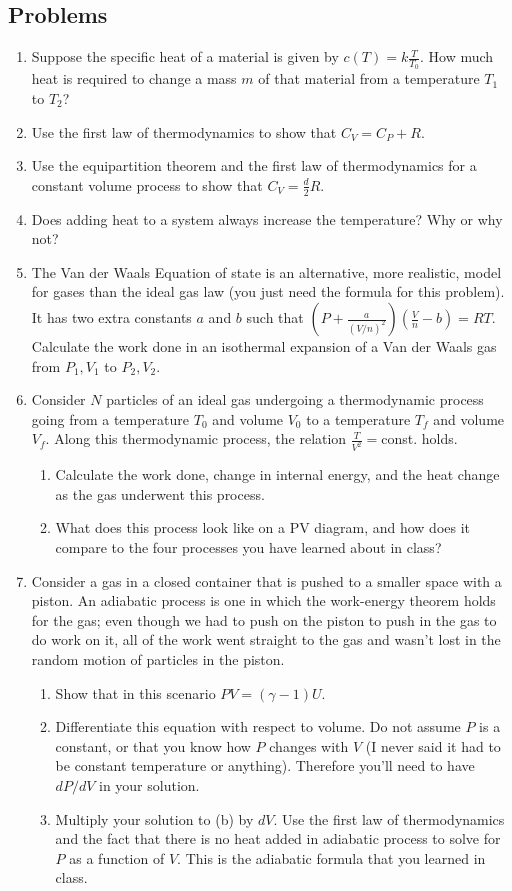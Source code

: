 \documentclass[12pt]{book}
\begin{document}
\subsection{Problems}
\begin{enumerate}
 \item Suppose the specific heat of a material is given by $c(T) = k \frac{T}{T_0}.$ How much heat is required to change a mass $m$ of that material from a temperature $T_1$ to $T_2$?
 \item Use the first law of thermodynamics to show that $C_V = C_P+R.$
 \item Use the equipartition theorem and the first law of thermodynamics for a constant volume process to show that $C_V = \frac{d}{2} R.$
 \item Does adding heat to a system always increase the temperature? Why or why not?
\item The Van der Waals Equation of state is an alternative, more realistic, model for gases than the ideal gas law (you just need the formula for this problem). It has two extra constants $a$ and $b$ such that $(P+\frac{a}{(V/n)^2})(\frac{V}{n}-b) = RT.$ Calculate the work done in an isothermal expansion of a Van der Waals gas from $P_1, V_1$ to $P_2, V_2.$
\item Consider $N$ particles of an ideal gas undergoing a thermodynamic process going from a temperature $T_0$ and volume $V_0$ to a temperature $T_f$ and volume $V_f.$ Along this thermodynamic process, the relation $\frac{T}{V^2}=$const. holds.
\begin{enumerate}
 \item Calculate the work done, change in internal energy, and the heat change as the gas underwent this process.
 \item What does this process look like on a PV diagram, and how does it compare to the four processes you have learned about in class? 
\end{enumerate}
 \item Consider a gas in a closed container that is pushed to a smaller space with a piston. An adiabatic process is one in which the work-energy theorem holds for the gas; even though we had to push on the piston to push in the gas to do work on it, all of the work went straight to the gas and wasn’t lost in the random motion of particles in the piston.
 \begin{enumerate}
  \item Show that in this scenario $PV = (\gamma-1)U.$
  \item Differentiate this equation with respect to volume. Do not assume $P$ is a constant, or that you know how $P$ changes with $V$ (I never said it had to be constant temperature or anything). Therefore you’ll need to have $dP/dV$ in your solution.
  \item Multiply your solution to (b) by $dV$. Use the first law of thermodynamics and the fact that there is no heat added in adiabatic process to solve for $P$ as a function of $V$. This is the adiabatic formula that you learned in class.
 \end{enumerate}



\end{enumerate}
\end{document}
